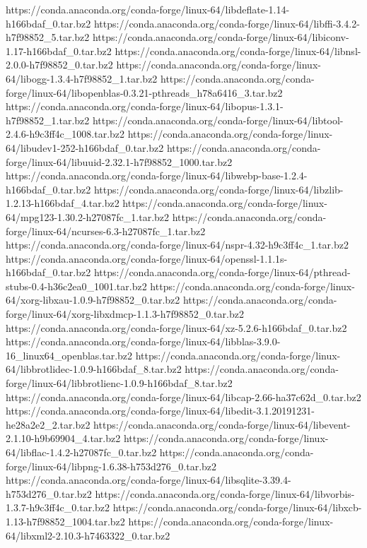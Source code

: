 https://conda.anaconda.org/conda-forge/linux-64/libdeflate-1.14-h166bdaf_0.tar.bz2
https://conda.anaconda.org/conda-forge/linux-64/libffi-3.4.2-h7f98852_5.tar.bz2
https://conda.anaconda.org/conda-forge/linux-64/libiconv-1.17-h166bdaf_0.tar.bz2
https://conda.anaconda.org/conda-forge/linux-64/libnsl-2.0.0-h7f98852_0.tar.bz2
https://conda.anaconda.org/conda-forge/linux-64/libogg-1.3.4-h7f98852_1.tar.bz2
https://conda.anaconda.org/conda-forge/linux-64/libopenblas-0.3.21-pthreads_h78a6416_3.tar.bz2
https://conda.anaconda.org/conda-forge/linux-64/libopus-1.3.1-h7f98852_1.tar.bz2
https://conda.anaconda.org/conda-forge/linux-64/libtool-2.4.6-h9c3ff4c_1008.tar.bz2
https://conda.anaconda.org/conda-forge/linux-64/libudev1-252-h166bdaf_0.tar.bz2
https://conda.anaconda.org/conda-forge/linux-64/libuuid-2.32.1-h7f98852_1000.tar.bz2
https://conda.anaconda.org/conda-forge/linux-64/libwebp-base-1.2.4-h166bdaf_0.tar.bz2
https://conda.anaconda.org/conda-forge/linux-64/libzlib-1.2.13-h166bdaf_4.tar.bz2
https://conda.anaconda.org/conda-forge/linux-64/mpg123-1.30.2-h27087fc_1.tar.bz2
https://conda.anaconda.org/conda-forge/linux-64/ncurses-6.3-h27087fc_1.tar.bz2
https://conda.anaconda.org/conda-forge/linux-64/nspr-4.32-h9c3ff4c_1.tar.bz2
https://conda.anaconda.org/conda-forge/linux-64/openssl-1.1.1s-h166bdaf_0.tar.bz2
https://conda.anaconda.org/conda-forge/linux-64/pthread-stubs-0.4-h36c2ea0_1001.tar.bz2
https://conda.anaconda.org/conda-forge/linux-64/xorg-libxau-1.0.9-h7f98852_0.tar.bz2
https://conda.anaconda.org/conda-forge/linux-64/xorg-libxdmcp-1.1.3-h7f98852_0.tar.bz2
https://conda.anaconda.org/conda-forge/linux-64/xz-5.2.6-h166bdaf_0.tar.bz2
https://conda.anaconda.org/conda-forge/linux-64/libblas-3.9.0-16_linux64_openblas.tar.bz2
https://conda.anaconda.org/conda-forge/linux-64/libbrotlidec-1.0.9-h166bdaf_8.tar.bz2
https://conda.anaconda.org/conda-forge/linux-64/libbrotlienc-1.0.9-h166bdaf_8.tar.bz2
https://conda.anaconda.org/conda-forge/linux-64/libcap-2.66-ha37c62d_0.tar.bz2
https://conda.anaconda.org/conda-forge/linux-64/libedit-3.1.20191231-he28a2e2_2.tar.bz2
https://conda.anaconda.org/conda-forge/linux-64/libevent-2.1.10-h9b69904_4.tar.bz2
https://conda.anaconda.org/conda-forge/linux-64/libflac-1.4.2-h27087fc_0.tar.bz2
https://conda.anaconda.org/conda-forge/linux-64/libpng-1.6.38-h753d276_0.tar.bz2
https://conda.anaconda.org/conda-forge/linux-64/libsqlite-3.39.4-h753d276_0.tar.bz2
https://conda.anaconda.org/conda-forge/linux-64/libvorbis-1.3.7-h9c3ff4c_0.tar.bz2
https://conda.anaconda.org/conda-forge/linux-64/libxcb-1.13-h7f98852_1004.tar.bz2
https://conda.anaconda.org/conda-forge/linux-64/libxml2-2.10.3-h7463322_0.tar.bz2

